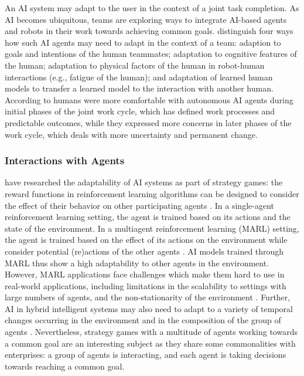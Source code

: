 An AI system may adapt to the user in the context of a joint task completion. As AI becomes ubiquitous, teams are exploring ways to
integrate AI-based agents and robots in their work towards achieving common goals. \cite{zhaoRoleAdaptationCollective2022} distinguish
four ways how such AI agents may need to adapt in the context of a team: adaption to goals and intentions of the human teammates;
adaptation to cognitive features of the human; adaptation to physical factors of the human in robot-human interactions (e.g., fatigue
of the human); and adaptation of learned human models to transfer a learned model to the interaction with another human.
According to \cite{hauptmanAdaptOvercomePerceptions2023} humans were more comfortable with autonomous AI agents during
initial phases of the joint work cycle, which has defined work processes and predictable outcomes, while they expressed more
concerns in later phases of the work cycle, which deals with more uncertainty and permanent change.
 
\subsubsection{Interactions with Agents}

\cite{madeiraDesigningReinforcementLearningBased2006} have researched the adaptability of AI 
systems as part of strategy games: the reward functions in reinforcement learning algorithms can be designed to consider
the effect of their behavior on other participating agents \citep{madeiraDesigningReinforcementLearningBased2006}.
In a single-agent reinforcement learning setting, the agent is trained based on its actions and the state of the
environment. In a multiagent reinforcement learning (MARL) setting, the agent is trained based on the effect of its
actions on the environment while consider potential (re)actions of the other agents \citep{caneseMultiAgentReinforcementLearning2021}.
AI models trained through MARL thus show a high adaptability to other agents in the environment. However, MARL applications
face challenges which make them hard to use in real-world applications, including limitations in the scalability to settings
with large numbers of agents, and the non-stationarity of the environment \citep{caneseMultiAgentReinforcementLearning2021}. 
Further, AI in hybrid intelligent systems may also need to adapt to a variety of temporal changes occurring in the environment
and in the composition of the group of agents \citep{akataResearchAgendaHybrid2020}. Nevertheless, strategy games with a
multitude of agents working towards a common goal are an interesting subject as they share some commonalities with enterprises:
a group of agents is interacting, and each agent is taking decisions towards reaching a common goal.

